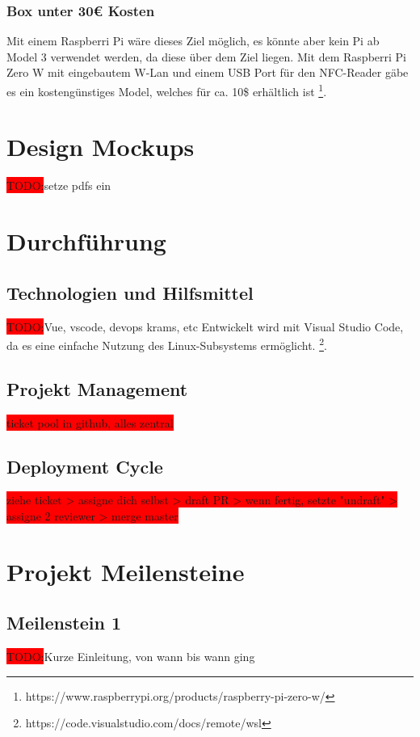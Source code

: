 \documentclass[10pt, a4paper, draft]{article}
\begin{document}
\subsubsection{Box unter 30€ Kosten}
Mit einem Raspberri Pi wäre dieses Ziel möglich, es könnte aber kein Pi ab Model 3 verwendet werden, da diese über dem Ziel liegen.
Mit dem Raspberri Pi Zero W mit eingebautem W-Lan und einem USB Port für den NFC-Reader gäbe es ein kostengünstiges Model, welches für ca. 10\$ erhältlich ist \footnote{https://www.raspberrypi.org/products/raspberry-pi-zero-w/}.

\section{Design Mockups}
\colorbox{red}{TODO:}setze pdfs ein

\section{Durchführung}

\subsection{Technologien und Hilfsmittel}
\colorbox{red}{TODO:}Vue, vscode, devops krams, etc
Entwickelt wird mit Visual Studio Code, da es eine einfache Nutzung des Linux-Subsystems ermöglicht. \footnote{https://code.visualstudio.com/docs/remote/wsl}.

\subsection{Projekt Management}
\colorbox{red}{ticket pool in github, alles zentral}

\subsection{Deployment Cycle}
\colorbox{red}{ziehe ticket > assigne dich selbst > draft PR > wenn fertig, setzte "undraft" > assigne 2 reviewer > merge master}

\section{Projekt Meilensteine}
\subsection{Meilenstein 1}
\colorbox{red}{TODO:}Kurze Einleitung, von wann bis wann ging
\end{document}
